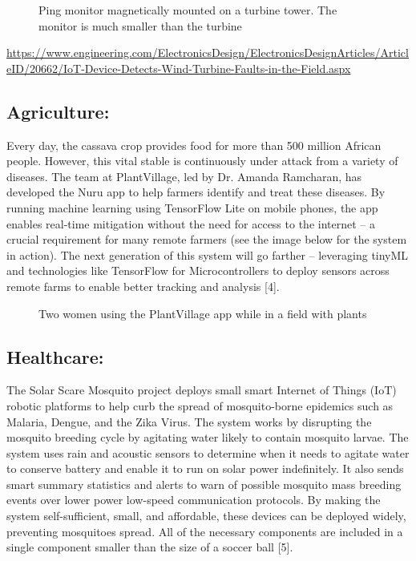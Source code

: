 \begin{figure}
  \caption{Ping monitor magnetically mounted on a turbine tower. The monitor is much smaller than the turbine}
\end{figure}  

\url{https://www.engineering.com/ElectronicsDesign/ElectronicsDesignArticles/ArticleID/20662/IoT-Device-Detects-Wind-Turbine-Faults-in-the-Field.aspx}

\subsection{Agriculture:}

Every day, the cassava crop provides food for more than 500 million African people. However, this vital stable is continuously under attack from a variety of diseases. The team at PlantVillage, led by Dr. Amanda Ramcharan, has developed the Nuru app to help farmers identify and treat these diseases. By running machine learning using TensorFlow Lite on mobile phones, the app enables real-time mitigation without the need for access to the internet -- a crucial requirement for many remote farmers (see the image below for the system in action). The next generation of this system will go farther -- leveraging tinyML and technologies like TensorFlow for Microcontrollers to deploy sensors across remote farms to enable better tracking and analysis [4].

\begin{figure}
    \caption{Two women using the PlantVillage app while in a field with plants}
\end{figure}  



\subsection{Healthcare:}

The Solar Scare Mosquito project deploys small smart Internet of Things (IoT) robotic platforms to help curb the spread of mosquito-borne epidemics such as Malaria, Dengue, and the Zika Virus. The system works by disrupting the mosquito breeding cycle by agitating water likely to contain mosquito larvae. The system uses rain and acoustic sensors to determine when it needs to agitate water to conserve battery and enable it to run on solar power indefinitely. It also sends smart summary statistics and alerts to warn of possible mosquito mass breeding events over lower power low-speed communication protocols. By making the system self-sufficient, small, and affordable, these devices can be deployed widely, preventing mosquitoes spread. All of the necessary components are included in a single component smaller than the size of a soccer ball [5].


